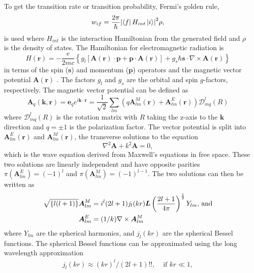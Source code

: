To get the transition rate or transition probability, Fermi's golden rule,
\begin{equation}
    \label{eq:golden}
    w_{if}=\frac{2\pi}{\hbar}\abs{\bra{f}H_{int}\ket{i}}^2\rho,
\end{equation}
is used where $H_{int}$ is the interaction Hamiltonian from the generated field and $\rho$ is the density of states. The Hamiltonian for electromagnetic radiation is
\begin{equation}
    H(\boldsymbol{r}) = -\frac{e}{2mc}\left\{g_l\left[\boldsymbol{A}(\boldsymbol{r})\cdot\boldsymbol{p}+\boldsymbol{p}\cdot\boldsymbol{A}(\boldsymbol{r})\right]+g_s\hbar\boldsymbol{s}\cdot\nabla\times\boldsymbol{A}(\boldsymbol{r})\right\}
\end{equation}
in terms of the spin ($\boldsymbol{s}$) and momentum ($\boldsymbol{p}$) operators and the magnetic vector potential $\boldsymbol{A}(\boldsymbol{r})$ \cite{brink93:_emradiation}. The factors $g_l$ and $g_s$ are the orbital and spin $g$-factors, respectively. The magnetic vector potential can be defined as
\begin{equation}
    \boldsymbol{A}_q(\boldsymbol{k},\boldsymbol{r})=\boldsymbol{e}_{q}e^{i\boldsymbol{k}\cdot\boldsymbol{r}}=\frac{1}{\sqrt{2}}\sum_{lm}\left(q\boldsymbol{A}^M_{lm}(\boldsymbol{r})+\boldsymbol{A}^E_{lm}(\boldsymbol{r})\right)\mathscr{D}^l_{mq}(R)
\end{equation}
where $\mathscr{D}^l_{mq}(R)$ is the rotation matrix with $R$ taking the z-axis to the $\boldsymbol{k}$ direction and $q=\pm 1$ is the polarization factor. The vector potential is split into $\boldsymbol{A}^E_{lm}(\boldsymbol{r})$ and $\boldsymbol{A}^M_{lm}(\boldsymbol{r})$, the transverse solutions to the equation 
\begin{equation}
    \nabla^2\boldsymbol{A}+k^2\boldsymbol{A}=0,
\end{equation}
which is the wave equation derived from Maxwell's equations in free space. These two solutions are linearly independent and have opposite parities $\pi(\boldsymbol{A}^E_{lm})=(-1)^l$ and $\pi(\boldsymbol{A}^M_{lm})=(-1)^{l-1}$. The two solutions can then be written as
\begin{subequations}
\begin{align}
    \sqrt{\left\{l(l+1)\right\}}\boldsymbol{A}^M_{lm}&=i^{l}(2l+1)j_{l}(kr)\boldsymbol{L}\left(\frac{2l+1}{4\pi}\right)^{\frac{1}{2}}Y_{lm}\textnormal{, and}\\
    \boldsymbol{A}^E_{lm}&=(1/k)\nabla\times\boldsymbol{A}^M_{lm}
\end{align}
\end{subequations}
where $Y_{lm}$ are the spherical harmonics, and $j_{l}(kr)$ are the spherical Bessel functions. The spherical Bessel functions can be approximated using the long wavelength approximation
\begin{align}
        j_{l}(kr)\approx (kr)^l/(2l+1)!!, & \text{ if } kr \ll 1,
\end{align}

